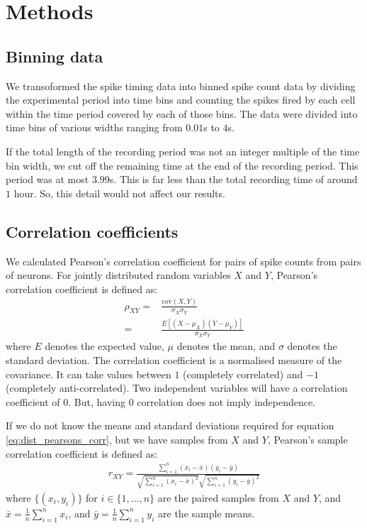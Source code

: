 \documentclass[a4paper,12pt]{article}
\theoremstyle{definition}
\newcommand{\cov}{\text{cov}} %
\begin{document}
\section{Methods}
    \subsection{Binning data}
    We transoformed the spike timing data into binned spike count data by dividing the experimental period into time bins and counting the spikes fired by each cell within the time period covered by each of those bins. The data were divided into time bins of various widths ranging from $0.01$s to $4$s.

    If the total length of the recording period was not an integer multiple of the time bin width, we cut off the remaining time at the end of the recording period. This period was at most $3.99$s. This is far less than the total recording time of around $1$ hour. So, this detail would not affect our results.

    \subsection{Correlation coefficients}
    We calculated Pearson's correlation coefficient for pairs of spike counts from pairs of neurons. For jointly distributed random variables $X$ and $Y$, Pearson's correlation coefficient is defined as:
    \begin{align}\label{eq:dist_pearsons_corr}
        \rho_{XY} =& \frac{\cov(X,Y)}{\sigma_X \sigma_Y} \\
                  =& \frac{E[(X - \mu_X)(Y - \mu_Y)]}{\sigma_X \sigma_Y}
    \end{align}
    where $E$ denotes the expected value, $\mu$ denotes the mean, and $\sigma$ denotes the standard deviation. The correlation coefficient is a normalised measure of the covariance. It can take values between $1$ (completely correlated) and $-1$ (completely anti-correlated). Two independent variables will have a correlation coefficient of $0$. But, having $0$ correlation does not imply independence.

    If we do not know the means and standard deviations required for equation \ref{eq:dist_pearsons_corr}, but we have samples from $X$ and $Y$, Pearson's sample correlation coefficient is defined as:
    \begin{align}
        r_{XY} = \frac{\sum_{i=1}^n (x_i - \bar{x})(y_i - \bar{y})}{\sqrt{\sum_{i=1}^n (x_i - \bar{x})^2}\sqrt{\sum_{i=1}^n (y_i - \bar{y})^2}}
    \end{align}
    where $\lbrace (x_i, y_i) \rbrace$ for $i \in \lbrace 1, \dots, n \rbrace$ are the paired samples from $X$ and $Y$, and $\bar{x} = \frac{1}{n}\sum_{i=1}^n x_i$, and $\bar{y} = \frac{1}{n}\sum_{i=1}^n y_i$ are the sample means.
\end{document}
